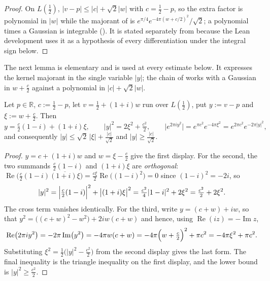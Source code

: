 \begin{proof}
\leanok
{}
On $L(\tfrac12)$, $\lvert v-p\rvert\le\lvert c\rvert+\sqrt2\lvert w\rvert$ with $c=\tfrac12-p$, so
the extra factor is polynomial in $\lvert w\rvert$ while the majorant of 
is $e^{\pi/4}e^{-4\pi(w+c/2)^{2}}/\sqrt2$; a polynomial times a Gaussian is integrable
().  It is stated separately from  because the
Lean development uses it as a hypothesis of every differentiation under the integral sign below.
\end{proof}

The next lemma is elementary and is used at every estimate below.  It expresses the kernel
majorant in the single variable $\lvert y\rvert$; the chain of  works with
a Gaussian in $w+\tfrac c2$ against a polynomial in $\lvert c\rvert+\sqrt2\lvert w\rvert$.

\begin{lemma}
\label{lem:rsf_kernel_gauss}
\leanok
{}
Let $p\in\mathbb{R}$, $c:=\tfrac12-p$, let $v=\tfrac12+(1+i)w$ run over $L(\tfrac12)$, put
$y:=v-p$ and $\xi:=w+\tfrac c2$.  Then
\[
  y=\tfrac{c}2(1-i)+(1+i)\xi,\qquad
  \lvert y\rvert^{2}=2\xi^{2}+\tfrac{c^{2}}2,\qquad
  \bigl\lvert e^{2\pi iy^{2}}\bigr\rvert
    =e^{\pi c^{2}}e^{-4\pi\xi^{2}}
    =e^{2\pi c^{2}}e^{-2\pi\lvert y\rvert^{2}} ,
\]
and consequently $\lvert y\rvert\le\sqrt2\,\lvert\xi\rvert+\tfrac{\lvert c\rvert}{\sqrt2}$ and
$\lvert y\rvert\ge\tfrac{\lvert c\rvert}{\sqrt2}$.
\end{lemma}

\begin{proof}
\leanok
{}
$y=c+(1+i)w$ and $w=\xi-\tfrac c2$ give the first display.  For the second, the two summands
$\tfrac c2(1-i)$ and $(1+i)\xi$ are \emph{orthogonal}: $\operatorname{Re}\bigl(\tfrac
c2(1-i)\overline{(1+i)\xi}\bigr)=\tfrac{c\xi}2\operatorname{Re}\bigl((1-i)^{2}\bigr)=0$ since
$(1-i)^{2}=-2i$, so
\[
  \lvert y\rvert^{2}=\Bigl\lvert\tfrac c2(1-i)\Bigr\rvert^{2}+\bigl\lvert(1+i)\xi\bigr\rvert^{2}
    =\tfrac{c^{2}}4\lvert1-i\rvert^{2}+2\xi^{2}=\tfrac{c^{2}}2+2\xi^{2} .
\]
The cross term vanishes identically.  For the third, write $y=(c+w)+iw$, so that $y^{2}=\bigl((c+w)^{2}-w^{2}\bigr)+2iw(c+w)$
and hence, using $\operatorname{Re}(iz)=-\operatorname{Im}z$,
\[
  \operatorname{Re}\bigl(2\pi iy^{2}\bigr)=-2\pi\operatorname{Im}\bigl(y^{2}\bigr)
   =-4\pi w(c+w)=-4\pi\Bigl(w+\tfrac c2\Bigr)^{2}+\pi c^{2}=-4\pi\xi^{2}+\pi c^{2} .
\]
Substituting $\xi^{2}=\tfrac12\bigl(\lvert y\rvert^{2}-\tfrac{c^{2}}2\bigr)$ from the second
display gives the last form.  The final inequality is the triangle inequality on the first
display, and the lower bound is $\lvert y\rvert^{2}\ge\tfrac{c^{2}}2$.
\end{proof}

